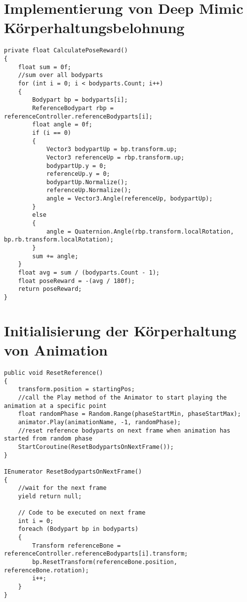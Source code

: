 \section{Implementierung von Deep Mimic Körperhaltungsbelohnung}
\begin{lstlisting}[caption={Implementierung von Deep Mimic Körperhaltungsbelohnung},captionpos=b,label={lst:skript_gehbewegungsbelohnungen}]
private float CalculatePoseReward()
{
    float sum = 0f;
    //sum over all bodyparts
    for (int i = 0; i < bodyparts.Count; i++)
    {
        Bodypart bp = bodyparts[i];
        ReferenceBodypart rbp = referenceController.referenceBodyparts[i];
        float angle = 0f;
        if (i == 0)
        {
            Vector3 bodypartUp = bp.transform.up;
            Vector3 referenceUp = rbp.transform.up;
            bodypartUp.y = 0;
            referenceUp.y = 0;
            bodypartUp.Normalize();
            referenceUp.Normalize();
            angle = Vector3.Angle(referenceUp, bodypartUp);
        }
        else
        {
            angle = Quaternion.Angle(rbp.transform.localRotation, bp.rb.transform.localRotation);
        }
        sum += angle;
    }
    float avg = sum / (bodyparts.Count - 1);
    float poseReward = -(avg / 180f);
    return poseReward;
}
\end{lstlisting}

\section{Initialisierung der Körperhaltung von Animation}
\begin{lstlisting}[caption={Implementierung Initialisierung des Charakters mit Körperhaltung aus Animation},captionpos=b,label={lst:skript_körperhaltung_initialisierung}]
 public void ResetReference()
{
    transform.position = startingPos;
    //call the Play method of the Animator to start playing the animation at a specific point
    float randomPhase = Random.Range(phaseStartMin, phaseStartMax);
    animator.Play(animationName, -1, randomPhase);
    //reset reference bodyparts on next frame when animation has started from random phase
    StartCoroutine(ResetBodypartsOnNextFrame());
}

IEnumerator ResetBodypartsOnNextFrame()
{
    //wait for the next frame
    yield return null;

    // Code to be executed on next frame
    int i = 0;
    foreach (Bodypart bp in bodyparts)
    {
        Transform referenceBone = referenceController.referenceBodyparts[i].transform;
        bp.ResetTransform(referenceBone.position, referenceBone.rotation);
        i++;
    }
}
\end{lstlisting}
